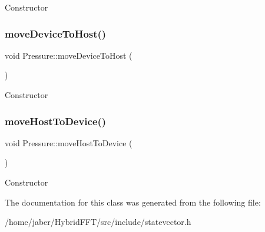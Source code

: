 Constructor \mbox{\label{classPressure_a0e275e2d44ba8e2c94baf98b2feb1475}} 
\subsubsection{\texorpdfstring{move\+Device\+To\+Host()}{moveDeviceToHost()}}
{\footnotesize\ttfamily void Pressure\+::move\+Device\+To\+Host (\begin{DoxyParamCaption}{ }\end{DoxyParamCaption})}

Constructor \mbox{\label{classPressure_aa02dc96fad914b90ebd39255b7c3d56a}} 
\subsubsection{\texorpdfstring{move\+Host\+To\+Device()}{moveHostToDevice()}}
{\footnotesize\ttfamily void Pressure\+::move\+Host\+To\+Device (\begin{DoxyParamCaption}{ }\end{DoxyParamCaption})}

Constructor 

The documentation for this class was generated from the following file\+:\begin{DoxyCompactItemize}
\item 
/home/jaber/\+Hybrid\+F\+F\+T/src/include/statevector.\+h\end{DoxyCompactItemize}
